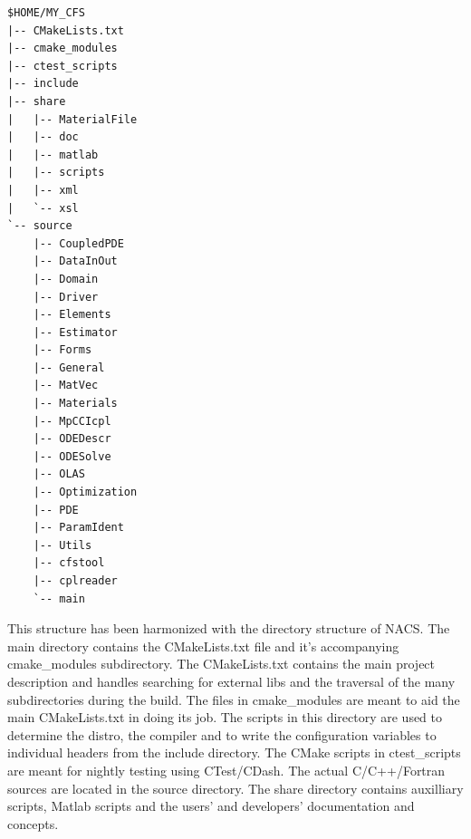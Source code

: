\begin{verbatim}
$HOME/MY_CFS
|-- CMakeLists.txt
|-- cmake_modules                                                                               
|-- ctest_scripts                                                                               
|-- include                                                                                     
|-- share                                                                                       
|   |-- MaterialFile                                                                            
|   |-- doc                                                                                     
|   |-- matlab                                                                                  
|   |-- scripts                                                                                 
|   |-- xml                                                                                     
|   `-- xsl                                                                                     
`-- source                                                                                      
    |-- CoupledPDE                                                                              
    |-- DataInOut                                                                               
    |-- Domain                                                                                  
    |-- Driver                                                                                  
    |-- Elements                                                                                
    |-- Estimator                                                                               
    |-- Forms                                                                                   
    |-- General
    |-- MatVec
    |-- Materials
    |-- MpCCIcpl
    |-- ODEDescr
    |-- ODESolve
    |-- OLAS
    |-- Optimization
    |-- PDE
    |-- ParamIdent
    |-- Utils
    |-- cfstool
    |-- cplreader
    `-- main
\end{verbatim}


This structure has been harmonized with the directory structure of NACS. The main directory contains the CMakeLists.txt file and it's accompanying cmake\_modules subdirectory. The CMakeLists.txt contains the main project description and handles searching for external libs and the traversal of the many subdirectories during the build. The files in cmake\_modules are meant to aid the main CMakeLists.txt in doing its job. The scripts in this directory are used to determine the distro, the compiler and to write the configuration variables to individual headers from the include directory. The CMake scripts in ctest\_scripts are meant for nightly testing using CTest/CDash. The actual C/C++/Fortran sources are located in the source directory. The share directory contains auxilliary scripts, Matlab scripts and the users' and developers' documentation and concepts.

